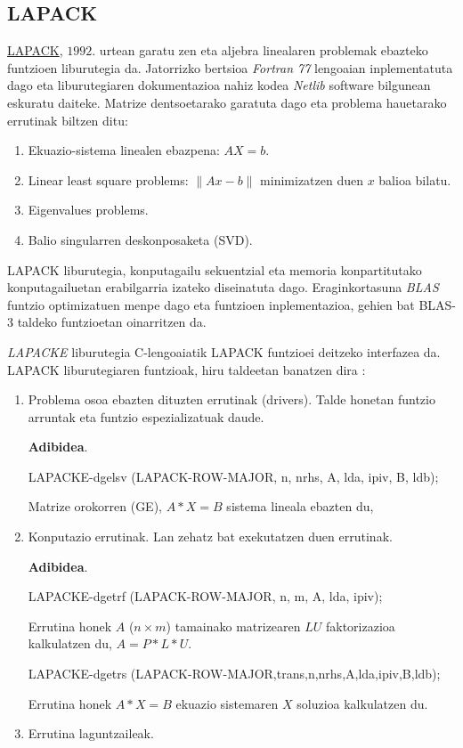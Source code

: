 \subsection*{LAPACK}


\href{http://www.netlib.org/lapack/}{LAPACK}, $1992.$ urtean garatu zen \cite{Anderson1999,Higham2002} eta aljebra linealaren problemak ebazteko funtzioen liburutegia da. Jatorrizko bertsioa \emph{Fortran 77} lengoaian inplementatuta dago eta liburutegiaren dokumentazioa nahiz kodea \emph{Netlib} software bilgunean eskuratu daiteke. Matrize dentsoetarako garatuta dago eta problema hauetarako errutinak biltzen ditu: 
\begin{enumerate}
\item Ekuazio-sistema linealen ebazpena: $AX=b$.
\item Linear least square problems: $\|Ax-b\|$ minimizatzen duen $x$ balioa bilatu.
\item Eigenvalues problems.
\item Balio singularren deskonposaketa (SVD).
\end{enumerate}

LAPACK liburutegia, konputagailu sekuentzial eta memoria konpartitutako konputagailuetan erabilgarria izateko diseinatuta dago. Eraginkortasuna \emph{BLAS} funtzio optimizatuen menpe dago eta funtzioen inplementazioa, gehien bat BLAS-3 taldeko funtzioetan oinarritzen da. 

\emph{LAPACKE} liburutegia C-lengoaiatik LAPACK funtzioei deitzeko interfazea da. LAPACK liburutegiaren funtzioak, hiru taldeetan banatzen dira \cite{Anderson1999,Intel2015}:
\begin{enumerate}
\item Problema osoa ebazten dituzten errutinak (drivers). Talde honetan funtzio arruntak eta funtzio espezializatuak daude.

\textbf{Adibidea}.

LAPACKE-dgelsv (LAPACK-ROW-MAJOR, n, nrhs, A, lda, ipiv, B, ldb);

Matrize orokorren (GE), $A * X = B$ sistema lineala ebazten du,


\item Konputazio errutinak. Lan zehatz bat exekutatzen duen errutinak.

\textbf{Adibidea}.

LAPACKE-dgetrf (LAPACK-ROW-MAJOR, n, m, A, lda, ipiv);

Errutina honek $A$ ($n \times m$) tamainako matrizearen $LU$ faktorizazioa kalkulatzen du, $A=P*L*U$.

LAPACKE-dgetrs (LAPACK-ROW-MAJOR,trans,n,nrhs,A,lda,ipiv,B,ldb);

Errutina honek $A*X=B$ ekuazio sistemaren $X$ soluzioa kalkulatzen du.
   

\item Errutina laguntzaileak.
\end{enumerate}


